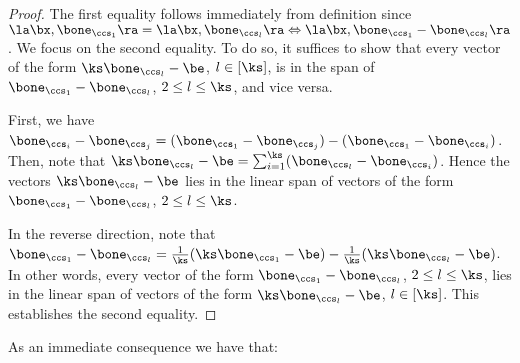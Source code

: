 \begin{proof}  The first equality follows immediately from definition since $\la \bx, \bone_{\ccs_1} \ra = \la \bx, \bone_{\ccs_l} \ra \Leftrightarrow \la \bx, \bone_{\ccs_1} - \bone_{\ccs_l} \ra$.  We focus on the second equality.  To do so, it suffices to show that every vector of the form $\ks \bone_{\ccs_l} -\be$, $l\in [\ks]$, is in the span of $\bone_{\ccs_1} - \bone_{\ccs_l}$, $2\le l\le \ks $, and vice versa.

First, we have $\bone_{\ccs_i} - \bone_{\ccs_j} = (\bone_{\ccs_1} - \bone_{\ccs_j}) - (\bone_{\ccs_1} - \bone_{\ccs_i})$.  Then, note that $\ks \bone_{\ccs_l} -\be = \sum_{i=1}^{\ks} (\bone_{\ccs_l} - \bone_{\ccs_i})$.  Hence the vectors $\ks \bone_{\ccs_l} -\be $ lies in the linear span of vectors of the form $\bone_{\ccs_1} - \bone_{\ccs_l}$, $2\le l\le \ks $.

In the reverse direction, note that $\bone_{\ccs_1} - \bone_{\ccs_l} = \frac{1}{\ks}(\ks \bone_{\ccs_1} -\be) - \frac{1}{\ks}(\ks \bone_{\ccs_l} -\be)$.  In other words, every vector of the form $\bone_{\ccs_1} - \bone_{\ccs_l}$, $2\le l\le \ks$, lies in the linear span of vectors of the form $\ks \bone_{\ccs_l} -\be$, $l\in [\ks]$.  This establishes the second equality.
%
\end{proof} 

As an immediate consequence we have that:

